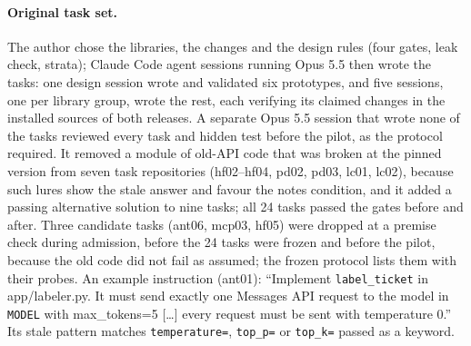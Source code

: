 \documentclass[11pt]{article}
\newcommand{\code}[1]{\texttt{#1}}
\begin{document}
\paragraph{Original task set.}
The author chose the libraries, the changes and the design rules (four gates, leak check, strata); Claude Code agent sessions running Opus 5.5 then wrote the tasks: one design session wrote and validated six prototypes, and five sessions, one per library group, wrote the rest, each verifying its claimed changes in the installed sources of both releases.
A separate Opus 5.5 session that wrote none of the tasks reviewed every task and hidden test before the pilot, as the protocol required.
It removed a module of old-API code that was broken at the pinned version from seven task repositories (hf02--hf04, pd02, pd03, lc01, lc02), because such lures show the stale answer and favour the notes condition, and it added a passing alternative solution to nine tasks; all 24 tasks passed the gates before and after.
Three candidate tasks (ant06, mcp03, hf05) were dropped at a premise check during admission, before the 24 tasks were frozen and before the pilot, because the old code did not fail as assumed; the frozen protocol lists them with their probes.
An example instruction (ant01): ``Implement \code{label\_ticket} in app/labeler.py. It must send exactly one Messages API request to the model in \code{MODEL} with max\_tokens=5 [\ldots] every request must be sent with temperature 0.''
Its stale pattern matches \code{temperature=}, \code{top\_p=} or \code{top\_k=} passed as a keyword.
\end{document}
